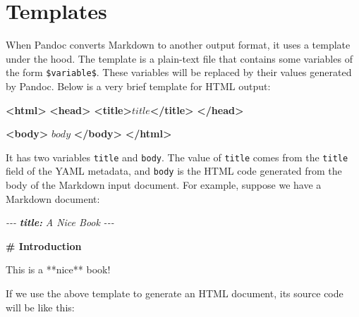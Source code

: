 \documentclass[
  12pt,
]{krantz}
\newenvironment{Shaded}{\begin{snugshade}}{\end{snugshade}}
\newcommand{\AnnotationTok}[1]{\textcolor[rgb]{0.56,0.35,0.01}{\textbf{\textit{#1}}}}
\newcommand{\CommentTok}[1]{\textcolor[rgb]{0.56,0.35,0.01}{\textit{#1}}}
\newcommand{\FunctionTok}[1]{\textcolor[rgb]{0.13,0.29,0.53}{\textbf{#1}}}
\newcommand{\KeywordTok}[1]{\textcolor[rgb]{0.13,0.29,0.53}{\textbf{#1}}}
\newcommand{\NormalTok}[1]{#1}
\begin{document}
\hypertarget{templates}{%
\section{Templates}\label{templates}}

When Pandoc converts Markdown to another output format, it uses a template under the hood. The template is a plain-text file that contains some variables of the form \texttt{\$variable\$}. These variables will be replaced by their values generated by Pandoc. Below is a very brief template for HTML output:

\begin{Shaded}
\begin{Highlighting}[]
\KeywordTok{\textless{}html\textgreater{}}
  \KeywordTok{\textless{}head\textgreater{}}
    \KeywordTok{\textless{}title\textgreater{}}\NormalTok{$title$}\KeywordTok{\textless{}/title\textgreater{}}
  \KeywordTok{\textless{}/head\textgreater{}}
  
  \KeywordTok{\textless{}body\textgreater{}}
\NormalTok{  $body$}
  \KeywordTok{\textless{}/body\textgreater{}}
\KeywordTok{\textless{}/html\textgreater{}}
\end{Highlighting}
\end{Shaded}

It has two variables \texttt{title} and \texttt{body}. The value of \texttt{title} comes from the \texttt{title} field of the YAML metadata, and \texttt{body} is the HTML code generated from the body of the Markdown input document. For example, suppose we have a Markdown document:

\begin{Shaded}
\begin{Highlighting}[]
\CommentTok{{-}{-}{-}}
\AnnotationTok{title:}\CommentTok{ A Nice Book}
\CommentTok{{-}{-}{-}}

\FunctionTok{\# Introduction}

\NormalTok{This is a **nice** book!}
\end{Highlighting}
\end{Shaded}

If we use the above template to generate an HTML document, its source code will be like this:
\end{document}
